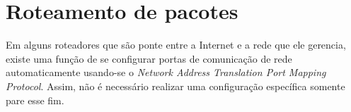 
\section{Roteamento de pacotes}

Em alguns roteadores que são ponte entre a Internet e a rede que ele gerencia, existe
uma função de se configurar portas de comunicação de rede automaticamente usando-se o
\emph{Network Address Translation Port Mapping Protocol}. Assim, não é necessário
realizar uma configuração específica somente pare esse fim.